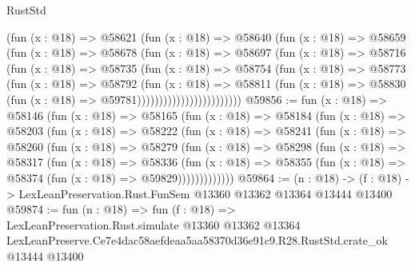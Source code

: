 \begin{lexlean}{RustStd}
\begin{coremodule}
                          (fun (x : @18) =>
                          @58621
                            (fun (x : @18) =>
                            @58640
                              (fun (x : @18) =>
                              @58659
                                (fun (x : @18) =>
                                @58678
                                  (fun (x : @18) =>
                                  @58697
                                    (fun (x : @18) =>
                                    @58716
                                      (fun (x : @18) =>
                                      @58735
                                        (fun (x : @18) =>
                                        @58754
                                          (fun (x : @18) =>
                                          @58773
                                            (fun (x : @18) =>
                                            @58792
                                              (fun (x : @18) =>
                                              @58811
                                                (fun (x : @18) =>
                                                @58830
                                                  (fun (x : @18) => @59781))))))))))))))))))))))))
@59856 := fun (x : @18) =>
  @58146
    (fun (x : @18) =>
    @58165
      (fun (x : @18) =>
      @58184
        (fun (x : @18) =>
        @58203
          (fun (x : @18) =>
          @58222
            (fun (x : @18) =>
            @58241
              (fun (x : @18) =>
              @58260
                (fun (x : @18) =>
                @58279
                  (fun (x : @18) =>
                  @58298
                    (fun (x : @18) =>
                    @58317
                      (fun (x : @18) =>
                      @58336
                        (fun (x : @18) =>
                        @58355 (fun (x : @18) => @58374 (fun (x : @18) => @59829)))))))))))))
@59864 := (n : @18) ->
  (f : @18) -> LexLeanPreservation.Rust.FunSem @13360 @13362 @13364 @13444 @13400
@59874 := fun (n : @18) =>
  fun (f : @18) =>
  LexLeanPreservation.Rust.simulate
    @13360
    @13362
    @13364
    LexLeanPreserve.Ce7e4dac58aefdeaa5aa58370d36e91c9.R28.RustStd.crate_ok
    @13444
    @13400
\end{coremodule}
\end{lexlean}
